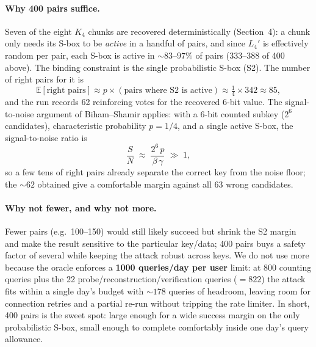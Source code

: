 \documentclass[11pt]{article}
\begin{document}
\paragraph{Why 400 pairs suffice.}
Seven of the eight $K_4$ chunks are recovered deterministically (Section~4): a
chunk only needs its S-box to be \emph{active} in a handful of pairs, and since
$L_4'$ is effectively random per pair, each S-box is active in $\sim\!83$--$97\%$
of pairs (333--388 of 400 above). The binding constraint is the single
probabilistic S-box (S2). The number of right pairs for it is
\[
  \mathbb{E}[\text{right pairs}] \approx p \times (\text{pairs where S2 is active})
  \approx \tfrac14 \times 342 \approx 85,
\]
and the run records 62 reinforcing votes for the recovered 6-bit value. The
signal-to-noise argument of Biham--Shamir applies: with a 6-bit counted
subkey ($2^6$ candidates), characteristic probability $p = 1/4$, and a single
active S-box, the signal-to-noise ratio is
\[
  \frac{S}{N} \;\approx\; \frac{2^{6}\, p}{\beta\,\gamma} \;\gg\; 1,
\]
so a few tens of right pairs already separate the correct key from the noise
floor; the $\sim\!62$ obtained give a comfortable margin against all 63 wrong
candidates.

\paragraph{Why not fewer, and why not more.}
Fewer pairs (e.g.\ 100--150) would still likely succeed but shrink the S2
margin and make the result sensitive to the particular key/data; 400 pairs buys
a safety factor of several while keeping the attack robust across keys. We do
not use more because the oracle enforces a \textbf{1000 queries/day per user}
limit: at 800 counting queries plus the 22 probe/reconstruction/verification
queries ($=822$) the attack fits within a single day's budget with
$\sim\!178$ queries of headroom, leaving room for connection retries and a
partial re-run without tripping the rate limiter. In short, 400 pairs is the
sweet spot: large enough for a wide success margin on the only probabilistic
S-box, small enough to complete comfortably inside one day's query allowance.
\end{document}
